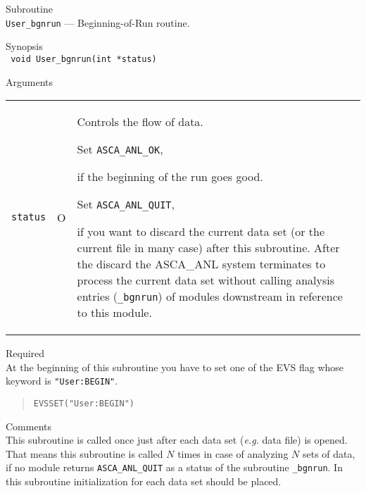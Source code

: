 \vspace{1cm}

\newpage
\begin{description}
\item{Subroutine}\\
   {\tt User\_bgnrun} --- Beginning-of-Run routine.
\item{Synopsis}\\
   {\tt
      void User\_bgnrun(int *status)
   }
\item{Arguments} \\
 \begin{tabular}{l@{\ (}c@{)\ }p{}}
   {\tt status} & O & Controls the flow of data.\par
        Set {\tt ASCA\_ANL\_OK},\par
        \hfill\parbox{0.65\textwidth}{
            if the beginning of the run goes good.
        }\par
        Set {\tt ASCA\_ANL\_QUIT},\par
        \hfill\parbox{0.65\textwidth}{
            if you want to discard the current data set (or the current file
            in many case) after this subroutine.
            After the discard
            the ASCA\_ANL system terminates to process the current data set
            without calling analysis entries ({\tt *\_bgnrun}) of modules 
            downstream in reference to this module.
        }\par
 \end{tabular}
\item{Required} \\
   At the beginning of this subroutine you have to set one of the EVS flag
   whose keyword is {\tt "User:BEGIN"}.
\begin{quote}\baselineskip 3.2mm\begin{verbatim}
EVSSET("User:BEGIN")
\end{verbatim}\end{quote}
\item{Comments} \\
   This subroutine is called once
   just after each data set ({\em e.g.} data file) is opened.
   That means
   this subroutine is called $N$ times
   in case of analyzing $N$ sets of data,
   if no module returns {\tt ASCA\_ANL\_QUIT}
   as a status of the subroutine {\tt *\_bgnrun}.
   In this subroutine
   initialization for each data set should be placed.
\end{description}

\vspace{1cm}

